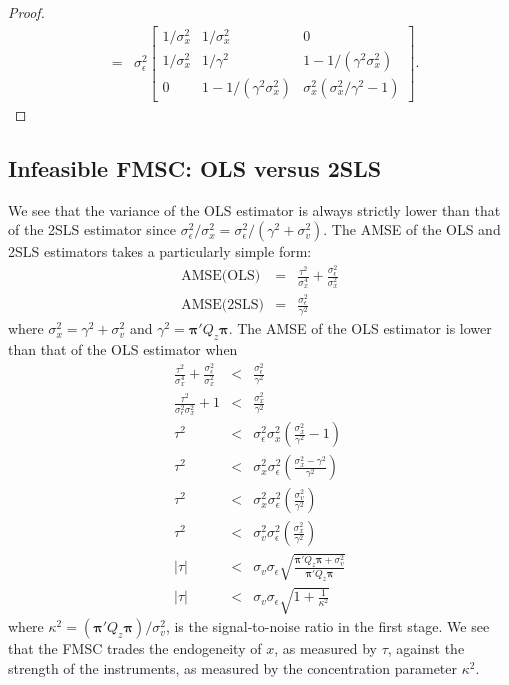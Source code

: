 \documentclass[12pt]{article}
\theoremstyle{definition}
\begin{document}
\begin{proof}
\begin{eqnarray*}
  &=& \sigma_\epsilon^2 \left[ \begin{array}{ccc}
  1/\sigma_x^2 & 1/\sigma_x^2 & 0\\
  1/\sigma_x^2 & 1/\gamma^2 & 1 - 1/(\gamma^2\sigma_x^2)\\
  0& 1 - 1/(\gamma^2 \sigma_x^2) & \sigma_x^2(\sigma_x^2/\gamma^2 - 1)
  \end{array}\right].
    \end{eqnarray*}
\end{proof}

\subsection{Infeasible FMSC: OLS versus 2SLS}
We see that the variance of the OLS estimator is always strictly lower than that of the 2SLS estimator since $\sigma^2_\epsilon/\sigma_x^2 = \sigma^2_\epsilon/(\gamma^2 + \sigma_v^2)$. The AMSE of the OLS and 2SLS estimators takes a particularly simple form:
  \begin{eqnarray}
  \mbox{AMSE(OLS)} &=& \frac{\tau^2}{\sigma_x^4} + \frac{\sigma_\epsilon^2}{\sigma_x^2}\\
  \mbox{AMSE(2SLS)} &=& \frac{\sigma_\epsilon^2}{\gamma^2}
  \end{eqnarray}
where $\sigma_x^2 = \gamma^2 + \sigma_v^2$ and $\gamma^2 = \boldsymbol{\pi}'Q_z \boldsymbol{\pi}$. The AMSE of the OLS estimator is lower than that of the OLS estimator when
  \begin{eqnarray*}
    \frac{\tau^2}{\sigma_x^4} + \frac{\sigma_\epsilon^2}{\sigma_x^2} &<& \frac{\sigma_\epsilon^2}{\gamma^2}\\
    \frac{\tau^2}{\sigma_\epsilon^2\sigma_x^2} + 1&<&\frac{\sigma_x^2}{\gamma^2}\\
    \tau^2 &<&\sigma_\epsilon^2\sigma_x^2\left(\frac{\sigma_x^2}{\gamma^2} - 1\right)\\
        \tau^2  &<& \sigma_x^2 \sigma_\epsilon^2\left(\frac{\sigma_x^2 - \gamma^2}{\gamma^2}\right)\\
        \tau^2  &<& \sigma_x^2 \sigma_\epsilon^2\left(\frac{\sigma_v^2}{\gamma^2}\right)\\
                \tau^2  &<& \sigma_v^2 \sigma_\epsilon^2\left(\frac{\sigma_x^2}{\gamma^2}\right)\\
              |\tau|  &<& \sigma_v \sigma_\epsilon\sqrt{\frac{\boldsymbol{\pi}'Q_z \boldsymbol{\pi} + \sigma_v^2}{\boldsymbol{\pi}'Q_z \boldsymbol{\pi}}}\\
              |\tau|  &<& \sigma_v \sigma_\epsilon \sqrt{1+ \frac{1}{\kappa^2}}
  \end{eqnarray*}
where $\kappa^2 = (\boldsymbol{\pi}'Q_z \boldsymbol{\pi})/\sigma_v^2$, is the signal-to-noise ratio in the first stage. We see that the FMSC trades the endogeneity of $x$, as measured by $\tau$, against the strength of the instruments, as measured by the concentration parameter $\kappa^2$. 
\end{document}
